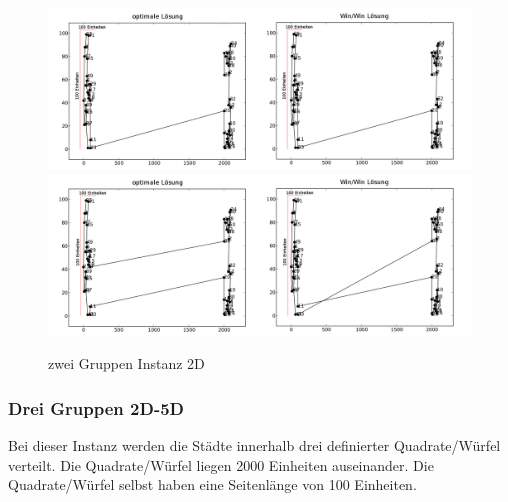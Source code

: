 \documentclass[11pt,a4paper]{article}
\begin{document}
\begin{figure}[H]
    \centering
    \includegraphics[width=15cm]{gfx/crowds2_hpp_comparison}
    \includegraphics[width=15cm]{gfx/crowds2_tsp_comparison}
    \caption{zwei Gruppen Instanz 2D}
    \label{img:crowds2_comparison}
\end{figure}

\subsubsection{Drei Gruppen 2D-5D}
Bei dieser Instanz werden die Städte innerhalb drei definierter Quadrate/Würfel verteilt. Die Quadrate/Würfel liegen 2000 Einheiten auseinander. Die Quadrate/Würfel selbst haben eine Seitenlänge von 100 Einheiten.
\end{document}
